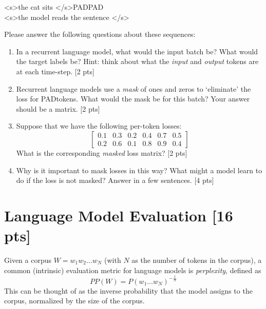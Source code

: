 \documentclass[11pt]{article}
\newcommand{\bos}{\textless s\textgreater\:}
\newcommand{\eos}{\textless /s\textgreater\:}
\newcommand{\pad}{PAD\:}
\begin{document}
\begin{center}
  \bos the cat sits \eos \pad \pad \\
  \bos the model reads the sentence \eos
\end{center}

Please answer the following questions about these sequences:
\begin{enumerate}[label=\alph*., itemsep=2em]
  \item In a recurrent language model, what would the input batch be? What would the target labels be? Hint: think about what the \textit{input} and \textit{output} tokens are at each time-step. [2 pts]
  \item Recurrent language models use a \emph{mask} of ones and zeros to `eliminate' the loss for \pad tokens. What would the mask be for this batch? Your answer should be a matrix. [2 pts]
  \item Suppose that we have the following per-token losses:
    \[\begin{bmatrix}
      0.1 & 0.3 & 0.2 & 0.4 & 0.7 & 0.5 \\
      0.2 & 0.6 & 0.1 & 0.8 & 0.9 & 0.4
    \end{bmatrix}\]
    What is the corresponding \emph{masked} loss matrix? [2 pts]
  \item Why is it important to mask losses in this way?  What might a model learn to do if the loss is not masked? Answer in a few sentences. [4 pts]
\end{enumerate}

\section{Language Model Evaluation [16 pts]}

 Given a corpus $W = w_1 w_2 \dots w_N$ (with $N$ as the number of tokens in the corpus), a common (intrinsic) evaluation metric for language models is \emph{perplexity}, defined as
\[ PP(W) = P(w_1 \dots w_N)^{-\frac{1}{N}} \]
This can be thought of as the inverse probability that the model assigns to the corpus, normalized by the size of the corpus.
\end{document}
